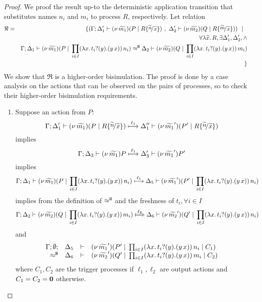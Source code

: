 \begin{proof}
	We proof the result up-to the deterministic application
	transition that substitutes names $n_i$ and $m_i$ to
	process $R$, respectively.
	Let relation
	\begin{eqnarray*}
		\Re	&=&	\set{	(\horel{\Gamma}{\Delta_1'}{\newsp{\widetilde{m_1}}{P \Par R \subst{\widetilde{n}}{\widetilde{x}} }}
						{\ ,\ }
						{\Delta_2'}{\newsp{\widetilde{m_2}}{Q \Par R \subst{\widetilde{m}}{\widetilde{x}} }})
					\setbar\\
					&& \forall \abs{\widetilde{x}}{R}, \exists \Delta_1', \Delta_2', \land \\
					&&	\horel{\Gamma}{\Delta_1}{\newsp{\widetilde{m_1}}{P \Par \prod_{i \in I} \appl{(\trvalx{t_i})}{n_i} }}
						{\hwb}
						{\Delta_2}{\newsp{\widetilde{m_2}}{Q \Par \prod_{i \in I} \appl{(\trvalx{t_i})}{m_i}}}\\
				&&}
	\end{eqnarray*}
	We show that $\Re$ is a higher-order bisimulation.
	The proof is done by a case analysis on the actions that can be observed
	on the pairs of processes, so to check their higher-order bisimulation requirements.

	\begin{enumerate}
		\item	Suppose an action from $P$:
		\[
					\horel{\Gamma}{\Delta_1'}{\newsp{\widetilde{m_1}}{P \Par R \subst{\widetilde{n}}{\widetilde{x}} }}
					{\hby{\ell_1}}
					{\Delta_1''}{\newsp{\widetilde{m_1}'}{P' \Par R \subst{\widetilde{n}}{\widetilde{x}} }}
				\]
				implies
				\[
					\Gamma; \Delta_3 \vdash (\nu\, \widetilde{m_1}){P} \stackrel{\ell_1}{\longmapsto} \Delta_3' \vdash (\nu\, \widetilde{m_1}'){P'}
				\]
				implies
				\[
					\Gamma; \Delta_1 \vdash (\nu\, \widetilde{m_1})(P \;|\; \prod_{i \in I} (\lambda x.\,t_i ? (y) . (y\, {x}))\, {n_i} ) \stackrel{\ell_1}{\longmapsto} \Delta_5 \vdash (\nu\, \widetilde{m_1}')(P' \;|\; \prod_{i \in I} (\lambda x.\,t_i ? (y) . (y\, {x}))\, {n_i} )
				\]
				implies from the definition of $\approx^\mathtt{H}$ and the
				freshness of $t_i, \forall i \in I$
				\[
					\horel{\Gamma}{\Delta_2}{\newsp{\widetilde{m_2}}{Q \Par \prod_{i \in I} \appl{(\trvalx{t_i})}{m_i} }}
					{\Hby{\ell_2}}
					{\Delta_6}{\newsp{\widetilde{m_2}'}{Q' \Par \prod_{i \in I} \appl{(\trvalx{t_i})}{n_i} }}
				\]
				and
				\begin{eqnarray}
					\begin{array}{rcll} \Gamma; \emptyset; &\Delta_5& \vdash& (\nu\, \widetilde{m_1}')(P' \;|\; \prod_{i \in I} (\lambda x.\,t_i ? (y) . (y\, {x}))\, {n_i} \;|\; C_1)\\ \approx^\mathtt{H} &\Delta_6& \vdash &  (\nu\, \widetilde{m_2}')(Q' \;|\; \prod_{i \in I} (\lambda x.\,t_i ? (y) . (y\, {x}))\, {m_i} \;|\; C_2) \end{array}
					\label{lem:trig_subst1}
				\end{eqnarray}
				where $C_1, C_2$ are the trigger processes if $\ell_1, \ell_2$ are output actions
				and $C_1 = C_2 = \mathbf{0}$ otherwise.


\end{enumerate}
\end{proof}
